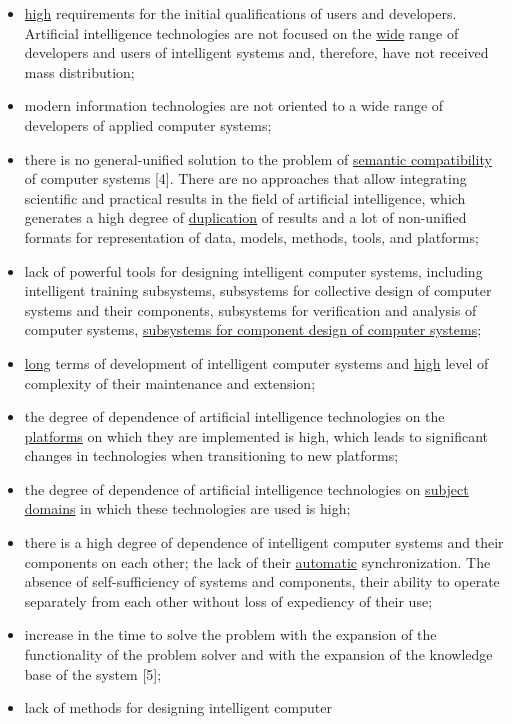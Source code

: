 \documentclass{article}
\begin{document}
\begin{multicols}{2}
\begin{itemize}[noitemsep]
\setlength{\parskip}{0pt}
    \item \uline{high} requirements for the initial qualifications of
users and developers. Artificial intelligence technologies are not focused on the \uline{wide} range of
developers and users of intelligent systems and,
therefore, have not received mass distribution;
    \item modern information technologies are not oriented
to a wide range of developers of applied computer
systems;
    \item there is no general-unified solution to the problem of \uline{semantic compatibility} of computer systems
[4]. There are no approaches that allow integrating
scientific and practical results in the field of artificial intelligence, which generates a high degree
of \uline{duplication} of results and a lot of non-unified
formats for representation of data, models, methods,
tools, and platforms;
\item lack of powerful tools for designing intelligent computer systems, including intelligent training subsystems, subsystems for collective design of computer
systems and their components, subsystems for verification and analysis of computer systems, \uline{subsystems
for component design of computer systems;}
\item  \uline{long} terms of development of intelligent computer
systems and \uline{high} level of complexity of their maintenance and extension;
\item the degree of dependence of artificial intelligence
technologies on the \uline{platforms} on which they are
implemented is high, which leads to significant
changes in technologies when transitioning to new
platforms;
\item the degree of dependence of artificial intelligence
technologies on \uline{subject domains} in which these
technologies are used is high;
\item there is a high degree of dependence of intelligent
computer systems and their components on each
other; the lack of their \uline{automatic} synchronization.
The absence of self-sufficiency of systems and components, their ability to operate separately from each
other without loss of expediency of their use;
\item increase in the time to solve the problem with the
expansion of the functionality of the problem solver
and with the expansion of the knowledge base of
the system [5];
\item lack of methods for designing intelligent computer

\end{itemize}
\end{multicols}
\end{document}
